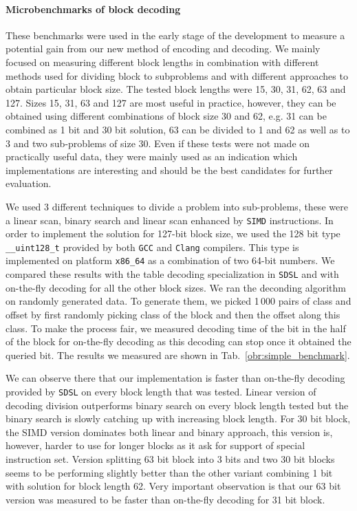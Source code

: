 \paragraph{Microbenchmarks of block decoding}

These benchmarks were used in the early stage of the development to measure a potential gain from
our new method of encoding and decoding. We mainly focused on measuring different block lengths
in combination with different methods used for dividing block to subproblems and with different
approaches to obtain particular block size. The tested block lengths were 15, 30, 31, 62, 63
and 127. Sizes 15, 31, 63 and 127 are most useful in practice, however, they can be obtained using
different combinations of block size 30 and 62, e.g. 31 can be combined as 1 bit and 30 bit solution,
63 can be divided to 1 and 62 as well as to 3 and two sub-problems of size 30. Even if these
tests were not made on practically useful data, they were mainly used as an indication which
implementations are interesting and should be the best candidates for further evaluation.

We used 3 different techniques to divide a problem into sub-problems, these were a linear scan,
binary search and linear scan enhanced by \texttt{SIMD} instructions. In order to implement the
solution for 127-bit block size, we used the 128 bit type \texttt{\_\_uint128\_t} provided by both
\texttt{GCC} and \texttt{Clang} compilers. This type is implemented on platform \texttt{x86\_64}
as a combination of two 64-bit numbers. We compared these results with the table decoding specialization
in \texttt{SDSL} and with on-the-fly decoding for all the other block sizes. We ran the deconding algorithm
on randomly generated data. To generate them, we picked 1\,000 pairs of class and offset by first randomly
picking class of the block and then the offset along this class. To make the process fair, we measured
decoding time of the bit in the half of the block for on-the-fly decoding as this decoding can stop once
it obtained the queried bit. The results we measured are shown in Tab.~\ref{obr:simple_benchmark}.

We can observe there that our implementation is faster than on-the-fly decoding provided by \texttt{SDSL}
on every block length that was tested. Linear version of decoding division outperforms binary search on
every block length tested but the binary search is slowly catching up with increasing block length.
For 30 bit block, the SIMD version dominates both linear and binary approach, this version is, however,
harder to use for longer blocks as it ask for support of special instruction set. Version splitting
63 bit block into 3 bits and two 30 bit blocks seems to be performing slightly better than the other
variant combining 1 bit with solution for block length 62. Very important observation is that our 63 bit
version was measured to be faster than on-the-fly decoding for 31 bit block.

